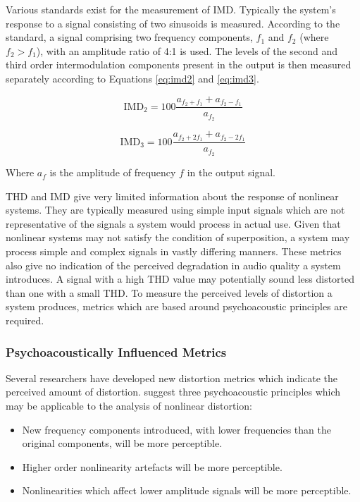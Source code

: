			Various standards exist for the measurement of IMD. Typically the system's response to a signal
			consisting of two sinusoids is measured. According to the \citet{IEC2001amplifiers} standard, a
			signal comprising two frequency components, $f_{1}$ and $f_{2}$ (where $f_{2} > f_{1}$), with an
			amplitude ratio of 4:1 is used.  The levels of the second and third order intermodulation components
			present in the output is then measured separately according to Equations \ref{eq:imd2} and
			\ref{eq:imd3}.

			\begin{equation}
				\mathrm{IMD}_{2} = 100\frac{a_{f_{2} + f_{1}} + a_{f_{2} - f_{1}}}{a_{f_{2}}}
				\label{eq:imd2}
			\end{equation}

			\begin{equation}
				\mathrm{IMD}_{3} = 100\frac{a_{f_{2} + 2f_{1}} + a_{f_{2} - 2f_{1}}}{a_{f_{2}}}
				\label{eq:imd3}
			\end{equation}

			Where $a_{f}$ is the amplitude of frequency $f$ in the output signal.

			THD and IMD give very limited information about the response of nonlinear systems. They are
			typically measured using simple input signals which are not representative of the signals a system
			would process in actual use. Given that nonlinear systems may not satisfy the condition of
			superposition, a system may process simple and complex signals in vastly differing manners. These
			metrics also give no indication of the perceived degradation in audio quality a system introduces. A
			signal with a high THD value may potentially sound less distorted than one with a small THD. To
			measure the perceived levels of distortion a system produces, metrics which are based around
			psychoacoustic principles are required.

		\subsubsection*{Psychoacoustically Influenced Metrics}
			Several researchers have developed new distortion metrics which indicate the perceived amount of
			distortion. \citet{geddes2003auditory} suggest three psychoacoustic principles which may be
			applicable to the analysis of nonlinear distortion:

			\begin{itemize}
				\item New frequency components introduced, with lower frequencies than the original
					components, will be more perceptible.
				\item Higher order nonlinearity artefacts will be more perceptible.
				\item Nonlinearities which affect lower amplitude signals will be more perceptible.
			\end{itemize}

